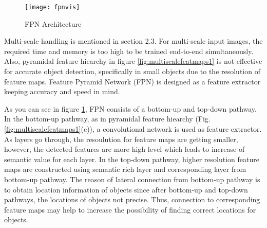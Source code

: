 \documentclass{article}
\begin{document}
\setlength{\parindent}{6ex}

\begin{figure}
    \centering
    \texttt{[image: fpnvis]}
    \caption{FPN Architecture}
    \label{fig:fpnvis1}
\end{figure}

\indent

Multi-scale handling is mentioned in section 2.3. For multi-scale input images, 
the required time and memory is too high to be trained end-to-end simultaneously. 
Also, pyramidal feature hiearchy in figure \ref{fig:multiscalefeatmaps1} is not 
effective for accurate object detection, specifically in small objects due to the 
resolution of feature maps. Feature Pyramid Network (FPN) is designed as a 
feature extractor keeping accuracy and speed in mind. \par 

As you can see in figure \ref{fig:fpnvis1}, FPN consists of a bottom-up and 
top-down pathway. In the bottom-up pathway, as in pyramidal feature hiearchy 
(Fig. \ref{fig:multiscalefeatmaps1}(c)), a convolutional network is used as 
feature extractor. As layers go through, the resoulution for feature maps 
are getting smaller, however, the detected features are more high level which 
leads to increase of semantic value for each layer. In the top-down pathway, 
higher resolution feature maps are constructed using semantic rich layer and 
corresponding layer from bottom-up pathway. The reason of lateral 
connection from bottom-up pathway is to obtain location information of 
objects since after bottom-up and top-down pathways, the locations of 
objects not precise. Thus, connection to corresponding feature maps 
may help to increase the possibility of finding correct locations for 
objects. 
\end{document}
